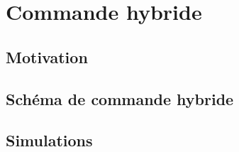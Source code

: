 \chapter{Commande hybride}
\minitoc

\section{Motivation}

\section{Schéma de commande hybride}

\section{Simulations}







